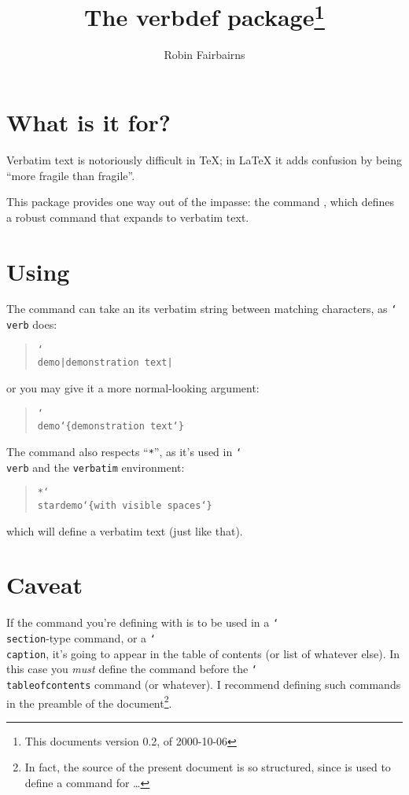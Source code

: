 \documentclass[a4paper]{article}
\providecommand\cs[1]{\texttt{\char`\\#1}}
\begin{document}
\title{The \textsf{verbdef} package\thanks{This documents version 0.2, of
    2000-10-06}}
\author{Robin Fairbairns}
\maketitle

\section{What is it for?}

Verbatim text is notoriously difficult in \TeX{}; in \LaTeX{} it adds
confusion by being ``more fragile than fragile''.

This package provides one way out of the impasse: the command
\verbdefcmd, which defines a robust command that expands to verbatim
text.

\section{Using \verbdefcmd}

The \verbdefcmd{} command can take an its verbatim string between
matching characters, as \cs{verb} does:
\begin{quote}
\verbdefcmd\cs{demo}\texttt{|demonstration text|}
\end{quote}
or you may give it a more normal-looking argument:
\begin{quote}
  \verbdefcmd\cs{demo}\texttt{\char`\{demonstration text\char`\}}
\end{quote}

The command also respects ``\texttt{*}'', as it's used in \cs{verb}
and the \texttt{verbatim} environment:
\begin{quote}
  \verbdefcmd\texttt{*}\cs{stardemo}\texttt{\char`\{with visible spaces\char`\}}
\end{quote}
%
\verbdef*{}%
which will define a verbatim text \stardemo{} (just like that).

\section{Caveat}

If the command you're defining with \verbdefcmd{} is to be used in a
\cs{section}-type command, or a \cs{caption}, it's going to appear in
the table of contents (or list of whatever else).  In this case you
\emph{must} define the command before the \cs{tableofcontents} command
(or whatever).  I recommend defining such commands in the preamble of
the document\footnote{In fact, the source of the present document is
  so structured, since \verbdefcmd{} is used to define a command for
  \verbdefcmd\dots}.
\end{document}
